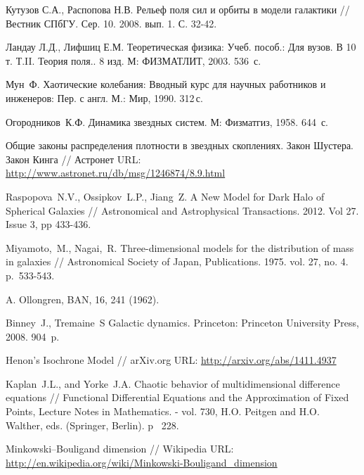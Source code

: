 \begin{thebibliography}{4.}

 Кутузов С.А., Распопова Н.В. Рельеф поля сил и орбиты в модели галактики // Вестник СПбГУ. Сер. 10. 2008. вып. 1. С. 32-42.

 Ландау Л.Д., Лифшиц Е.М. Теоретическая физика: Учеб. пособ.: Для вузов. В 10 т. Т.II. Теория поля.. 8 изд. М: ФИЗМАТЛИТ, 2003.  536~с.

 Мун~Ф. Хаотические колебания: Вводный курс для научных работников и инженеров: Пер. с англ. М.: Мир, 1990. 312\,с.

 Огородников~К.\:Ф. Динамика звездных систем. М: Физматгиз, 1958. 644~с.

 Общие законы распределения плотности в звездных скоплениях. Закон Шустера. Закон Кинга // Астронет URL: \url{http://www.astronet.ru/db/msg/1246874/8.9.html}

  Raspopova~N.V., Ossipkov~L.P., Jiang~Z. A New Model for Dark Halo of Spherical Galaxies // Astronomical and Astrophysical Transactions. 2012. Vol 27. Issue 3, pp 433-436.

 Miyamoto,~M., Nagai,~R. Three-dimensional models for the distribution of mass in galaxies // Astronomical Society of Japan, Publications. 1975. vol. 27, no. 4. p.~533-543.

 A. Ollongren, BAN, 16, 241 (1962).

 Binney~J., Tremaine~S Galactic dynamics. Princeton:  Princeton University Press, 2008. 904~p.

 Henon's Isochrone Model // arXiv.org URL: \url{http://arxiv.org/abs/1411.4937}

 Kaplan~J.L., and Yorke~J.A. Chaotic behavior of multidimensional difference equations // Functional Differential Equations and the Approximation of Fixed Points, Lecture Notes in Mathematics. - vol. 730, H.O. Peitgen and H.O. Walther, eds. (Springer, Berlin). p~ 228.

 Minkowski–Bouligand dimension // Wikipedia URL: \url{http://en.wikipedia.org/wiki/Minkowski-Bouligand_dimension}

\end{thebibliography}